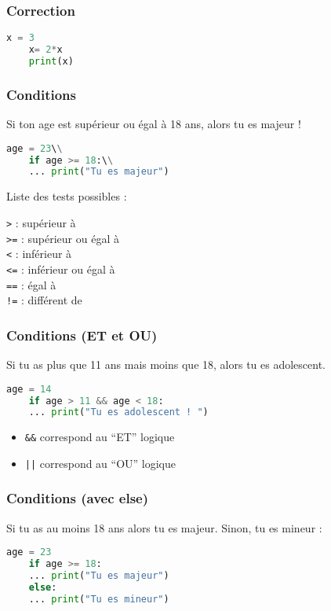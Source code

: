 \documentclass{beamer}
\begin{document}
\begin{frame}[fragile]
  \frametitle{Correction}
  \begin{lstlisting}[language=python]
    x = 3
    x= 2*x
    print(x)
  \end{lstlisting}
\end{frame}

\begin{frame}[fragile]
    \frametitle{Conditions}
    Si ton age est supérieur ou égal à 18 ans, alors tu es majeur !
    \begin{lstlisting}[language=python]
    age = 23\\
    if age >= 18:\\
    ... print("Tu es majeur")
    \end{lstlisting}

    \medbreak
    Liste des tests possibles :

    \texttt{>}  : supérieur à\\
    \texttt{>=} : supérieur ou égal à\\
    \texttt{<}  : inférieur à\\
    \texttt{<=} : inférieur ou égal à\\
    \texttt{==} : égal à\\
    \texttt{!=} : différent de\\

\end{frame}

\begin{frame}[fragile]
    \frametitle{Conditions (ET et OU)}
    Si tu as plus que 11 ans mais moins que 18, alors tu es adolescent.
    \medbreak
    \begin{lstlisting}[language=python]
    age = 14
    if age > 11 && age < 18:
    ... print("Tu es adolescent ! ")
    \end{lstlisting}

    \medbreak
    \begin{itemize}
    \item     \texttt{\&\&} correspond au ``ET'' logique \\
    \item     \texttt{||} correspond au ``OU'' logique
    \end{itemize}
\end{frame}

\begin{frame}[fragile]
    \frametitle{Conditions (avec else)}
    Si tu as au moins 18 ans alors tu es majeur. Sinon, tu es mineur :
    \medbreak
    \begin{lstlisting}[language=python]
    age = 23
    if age >= 18:
    ... print("Tu es majeur")
    else:
    ... print("Tu es mineur")
    \end{lstlisting}

\end{frame}
\end{document}

